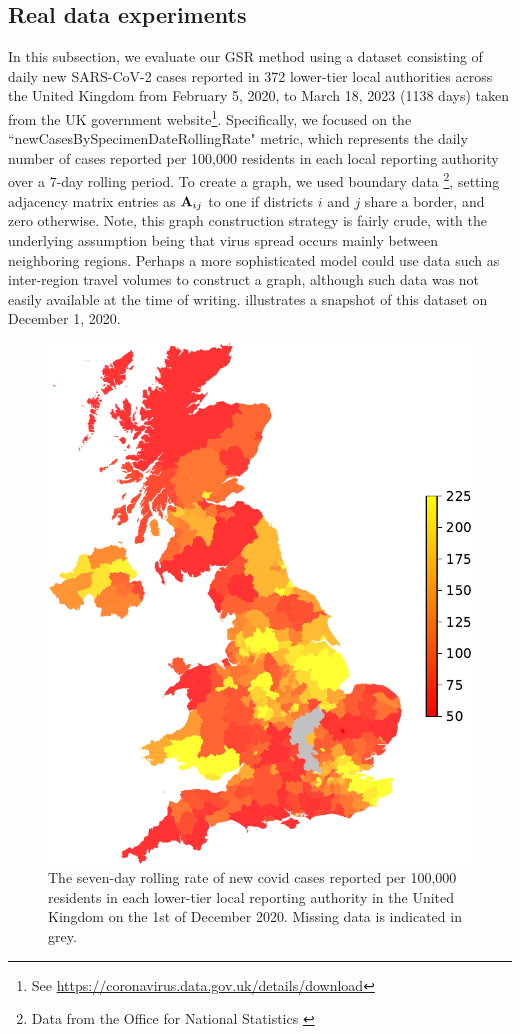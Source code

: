 \subsection{Real data experiments}

In this subsection, we evaluate our GSR method using a dataset consisting of daily new SARS-CoV-2 cases reported in 372 lower-tier local authorities across the United Kingdom from February 5, 2020, to March 18, 2023 (1138 days) taken from the UK government website\footnote{See \url{https://coronavirus.data.gov.uk/details/download}}. Specifically, we focused on the ``newCasesBySpecimenDateRollingRate" metric, which represents the daily number of cases reported per 100,000 residents in each local reporting authority over a 7-day rolling period. To create a graph, we used boundary data \footnote{Data from the Office for National Statistics \citep{ONS2019}}, setting adjacency matrix entries as $\mathbf{A}_{ij}$ to one if districts $i$ and $j$ share a border, and zero otherwise. Note, this graph construction strategy is fairly crude, with the underlying assumption being that virus spread occurs mainly between neighboring regions. Perhaps a more sophisticated model could use data such as inter-region travel volumes to construct a graph, although such data was not easily available at the time of writing.  illustrates a snapshot of this dataset on December 1, 2020.


\begin{figure}[t]
    \begin{center}
        \includegraphics[width=0.6\linewidth]{Figures/UK_covid.pdf}
    \end{center}
    \caption[Snapshot of the Covid-19 case rate in the UK]{\small{The seven-day rolling rate of new covid cases reported per 100,000 residents in each lower-tier local reporting authority in the United Kingdom on the 1st of December 2020. Missing data is indicated in grey.}}
    \label{fig:covid}
\end{figure}


